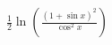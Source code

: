 \documentclass[preview]{standalone}
\begin{document}
\begin{align*}
\frac{1}{2} \ln \left( \frac{(1 + \sin{x})^2}{\cos^2{x}} \right)
\end{align*}
\end{document}
